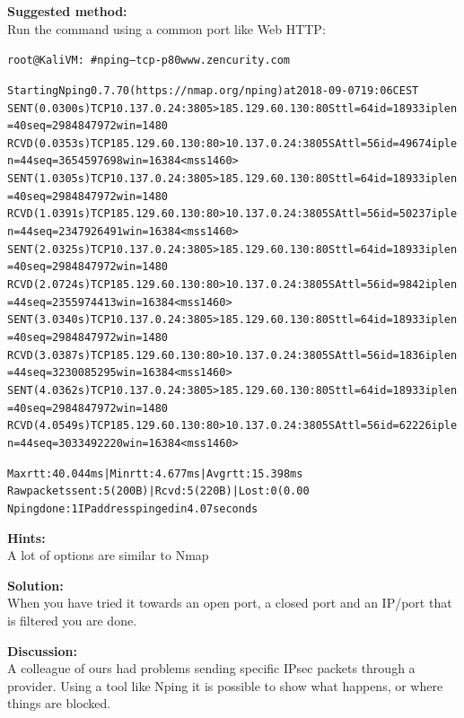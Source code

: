 \documentclass[a4paper,11pt,notitlepage]{report}
\begin{document}
{\bf Suggested method:}\\
Run the command using a common port like Web HTTP:
\begin{alltt}\footnotesize
root@KaliVM:~# nping --tcp -p 80 www.zencurity.com

Starting Nping 0.7.70 ( https://nmap.org/nping ) at 2018-09-07 19:06 CEST
SENT (0.0300s) TCP 10.137.0.24:3805 > 185.129.60.130:80 S ttl=64 id=18933 iplen=40  seq=2984847972 win=1480
RCVD (0.0353s) TCP 185.129.60.130:80 > 10.137.0.24:3805 SA ttl=56 id=49674 iplen=44  seq=3654597698 win=16384 <mss 1460>
SENT (1.0305s) TCP 10.137.0.24:3805 > 185.129.60.130:80 S ttl=64 id=18933 iplen=40  seq=2984847972 win=1480
RCVD (1.0391s) TCP 185.129.60.130:80 > 10.137.0.24:3805 SA ttl=56 id=50237 iplen=44  seq=2347926491 win=16384 <mss 1460>
SENT (2.0325s) TCP 10.137.0.24:3805 > 185.129.60.130:80 S ttl=64 id=18933 iplen=40  seq=2984847972 win=1480
RCVD (2.0724s) TCP 185.129.60.130:80 > 10.137.0.24:3805 SA ttl=56 id=9842 iplen=44  seq=2355974413 win=16384 <mss 1460>
SENT (3.0340s) TCP 10.137.0.24:3805 > 185.129.60.130:80 S ttl=64 id=18933 iplen=40  seq=2984847972 win=1480
RCVD (3.0387s) TCP 185.129.60.130:80 > 10.137.0.24:3805 SA ttl=56 id=1836 iplen=44  seq=3230085295 win=16384 <mss 1460>
SENT (4.0362s) TCP 10.137.0.24:3805 > 185.129.60.130:80 S ttl=64 id=18933 iplen=40  seq=2984847972 win=1480
RCVD (4.0549s) TCP 185.129.60.130:80 > 10.137.0.24:3805 SA ttl=56 id=62226 iplen=44  seq=3033492220 win=16384 <mss 1460>

Max rtt: 40.044ms | Min rtt: 4.677ms | Avg rtt: 15.398ms
Raw packets sent: 5 (200B) | Rcvd: 5 (220B) | Lost: 0 (0.00%
Nping done: 1 IP address pinged in 4.07 seconds
\end{alltt}

{\bf Hints:} \\
A lot of options are similar to Nmap

{\bf Solution:}\\
When you have tried it towards an open port, a closed port and an IP/port that is filtered you are done.

{\bf Discussion:}\\
A colleague of ours had problems sending specific IPsec packets through a provider. Using a tool like Nping it is possible to show what happens, or where things are blocked.
\end{document}
